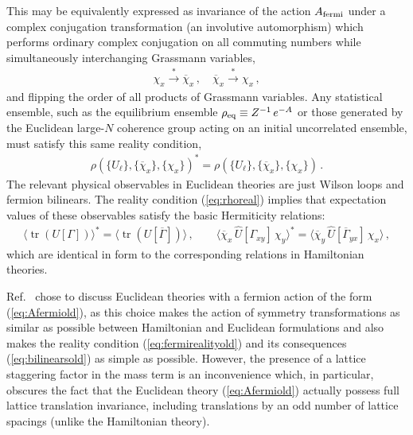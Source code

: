 \documentclass [12pt]{article}
\newcommand{\tr}{\mathop{\mathrm{tr}}}
\begin{document}
This may be equivalently expressed as invariance of
the action $A_{\rm fermi}$ under a complex conjugation transformation
(an involutive automorphism)
which performs ordinary complex conjugation on all
commuting numbers while simultaneously interchanging Grassmann variables,
\begin{align}
    \chi_x \xrightarrow{*}  \overline\chi_x \,,\quad
    \overline\chi_x \xrightarrow{*}  \chi_x \,,
\label{eq:fermirealityold}
\end{align}
and flipping the order of all products of Grassmann variables.
%
Any statistical ensemble,
such as the equilibrium ensemble
$
    \rho_{\rm eq} \equiv Z^{-1} \, e^{-A}
$
or those generated by the
Euclidean large-$N$ coherence group acting on an initial uncorrelated ensemble,
must satisfy this same reality condition,
\begin{align}
    \rho(\{U_\ell\},\{\overline\chi_x\},\{\chi_x\})^*
    =
    \rho(\{U_\ell\},\{\overline\chi_x\},\{\chi_x\}) \,.
\label{eq:rhoreal}
\end{align}
The relevant physical observables in Euclidean theories are just
Wilson loops and fermion bilinears.
The reality condition (\ref{eq:rhoreal})
implies that expectation values of these observables satisfy
the basic Hermiticity relations:
\begin{align}
    \langle \tr(U[\Gamma]) \rangle^*
    =
    \langle \tr(U[\overline\Gamma]) \rangle \,,
    \qquad
    \big\langle \overline \chi_x \, \hat U[\Gamma_{xy}] \, \chi_y \big\rangle^*
    =
    \big\langle \overline \chi_y \, \hat U[\overline\Gamma_{yx}] \, \chi_x \big\rangle \,,
\label{eq:bilinearsold}
\end{align}
which are identical in form to the corresponding relations in Hamiltonian theories.

Ref.~\cite{CSVAII} chose to discuss Euclidean theories with
a fermion action of the form (\ref{eq:Afermiold}),
as this choice makes the action of symmetry transformations
as similar as possible between Hamiltonian and Euclidean formulations
and also makes the reality condition (\ref{eq:fermirealityold})
and its consequences (\ref{eq:bilinearsold})
as simple as possible.
However, the presence of a lattice staggering factor in the mass term
is an inconvenience which, in particular, obscures the fact that
the Euclidean theory (\ref{eq:Afermiold}) actually possess full lattice
translation invariance, including translations by an odd number of lattice spacings
(unlike the Hamiltonian theory).
\end{document}
